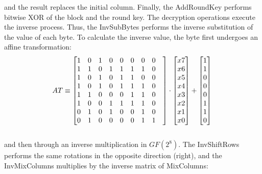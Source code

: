 \noindent
and the result replaces the initial column. Finally, the AddRoundKey performs bitwise XOR of the block and the round key.
The decryption operations execute the inverse process. Thus, the InvSubBytes performs the inverse substitution of the value of each byte. To calculate the inverse value, the byte first undergoes an affine transformation:\\

\begin{equation}
AT  \equiv
\begin{bmatrix}
1  & 0  & 1  & 0  & 0  & 0  & 0  & 0  &  \\
1  & 1  & 0  & 1  & 1  & 1  & 1  & 0  &  \\
1  & 0  & 1  & 0  & 1  & 1  & 0  & 0  &  \\
1  & 0  & 1  & 0  & 1  & 1  & 1  & 0  &  \\
1  & 1  & 0  & 0  & 0  & 1  & 1  & 0  &  \\
1  & 0  & 0  & 1  & 1  & 1  & 1  & 0  &  \\
0  & 1  & 0  & 1  & 0  & 0  & 1  & 0  &  \\
0  & 1  & 0  & 0  & 0  & 0  & 1  & 1  &  \\
\end{bmatrix}
\cdot
\begin{bmatrix}
x7 \\
x6 \\
x5 \\
x4 \\
x3 \\
x2 \\
x1 \\
x0 \\
\end{bmatrix}
+
\begin{bmatrix}
1 \\
1 \\
0 \\
0 \\
0 \\
1 \\
1 \\
0 \\
\end{bmatrix}\\
\end{equation}\\

\noindent
and then through an inverse multiplication in $GF(2^8)$.
The InvShiftRows performs the same rotations in the opposite direction (right), and the InvMixColumns multiplies by the inverse matrix of MixColumns:\\

